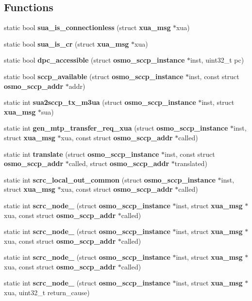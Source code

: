 \subsection*{Functions}
\begin{DoxyCompactItemize}
\item 
static bool {\bf sua\+\_\+is\+\_\+connectionless} (struct {\bf xua\+\_\+msg} $\ast$xua)
\item 
static bool {\bf sua\+\_\+is\+\_\+cr} (struct {\bf xua\+\_\+msg} $\ast$xua)
\item 
static bool {\bf dpc\+\_\+accessible} (struct {\bf osmo\+\_\+sccp\+\_\+instance} $\ast$inst, uint32\+\_\+t pc)
\item 
static bool {\bf sccp\+\_\+available} (struct {\bf osmo\+\_\+sccp\+\_\+instance} $\ast$inst, const struct {\bf osmo\+\_\+sccp\+\_\+addr} $\ast$addr)
\item 
static int {\bf sua2sccp\+\_\+tx\+\_\+m3ua} (struct {\bf osmo\+\_\+sccp\+\_\+instance} $\ast$inst, struct {\bf xua\+\_\+msg} $\ast$sua)
\item 
static int {\bf gen\+\_\+mtp\+\_\+transfer\+\_\+req\+\_\+xua} (struct {\bf osmo\+\_\+sccp\+\_\+instance} $\ast$inst, struct {\bf xua\+\_\+msg} $\ast$xua, const struct {\bf osmo\+\_\+sccp\+\_\+addr} $\ast$called)
\item 
static int {\bf translate} (struct {\bf osmo\+\_\+sccp\+\_\+instance} $\ast$inst, const struct {\bf osmo\+\_\+sccp\+\_\+addr} $\ast$called, struct {\bf osmo\+\_\+sccp\+\_\+addr} $\ast$translated)
\item 
static int {\bf scrc\+\_\+local\+\_\+out\+\_\+common} (struct {\bf osmo\+\_\+sccp\+\_\+instance} $\ast$inst, struct {\bf xua\+\_\+msg} $\ast$xua, const struct {\bf osmo\+\_\+sccp\+\_\+addr} $\ast$called)
\item 
static int {\bf scrc\+\_\+node\+\_} (struct {\bf osmo\+\_\+sccp\+\_\+instance} $\ast$inst, struct {\bf xua\+\_\+msg} $\ast$xua, const struct {\bf osmo\+\_\+sccp\+\_\+addr} $\ast$called)
\item 
static int {\bf scrc\+\_\+node\+\_} (struct {\bf osmo\+\_\+sccp\+\_\+instance} $\ast$inst, struct {\bf xua\+\_\+msg} $\ast$xua, const struct {\bf osmo\+\_\+sccp\+\_\+addr} $\ast$called)
\item 
static int {\bf scrc\+\_\+node\+\_} (struct {\bf osmo\+\_\+sccp\+\_\+instance} $\ast$inst, struct {\bf xua\+\_\+msg} $\ast$xua, const struct {\bf osmo\+\_\+sccp\+\_\+addr} $\ast$called)
\item 
static int {\bf scrc\+\_\+node\+\_} (struct {\bf osmo\+\_\+sccp\+\_\+instance} $\ast$inst, struct {\bf xua\+\_\+msg} $\ast$xua, uint32\+\_\+t return\+\_\+cause)

\end{DoxyCompactItemize}
